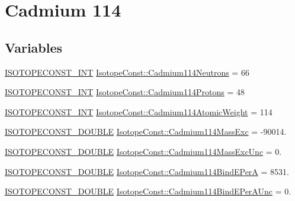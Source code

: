 \hypertarget{group___isotope_const-_cadmium-_cd114}{}\section{Cadmium 114}
\label{group___isotope_const-_cadmium-_cd114}
\subsection*{Variables}
\begin{DoxyCompactItemize}
\item 
\mbox{\hyperlink{group___isotope_const-_macros_ga5f18360b3e99483a35c32d789e62621c}{I\+S\+O\+T\+O\+P\+E\+C\+O\+N\+S\+T\+\_\+\+I\+NT}} \mbox{\hyperlink{group___isotope_const-_cadmium-_cd114_ga06ba1887fdc09963d05c6058df8bcdec}{Isotope\+Const\+::\+Cadmium114\+Neutrons}} = 66
\item 
\mbox{\hyperlink{group___isotope_const-_macros_ga5f18360b3e99483a35c32d789e62621c}{I\+S\+O\+T\+O\+P\+E\+C\+O\+N\+S\+T\+\_\+\+I\+NT}} \mbox{\hyperlink{group___isotope_const-_cadmium-_cd114_ga3fcc86c15d983e409a2fe22e88c5fe9d}{Isotope\+Const\+::\+Cadmium114\+Protons}} = 48
\item 
\mbox{\hyperlink{group___isotope_const-_macros_ga5f18360b3e99483a35c32d789e62621c}{I\+S\+O\+T\+O\+P\+E\+C\+O\+N\+S\+T\+\_\+\+I\+NT}} \mbox{\hyperlink{group___isotope_const-_cadmium-_cd114_ga52f0160d4be26c3f2ab31dce613cdc46}{Isotope\+Const\+::\+Cadmium114\+Atomic\+Weight}} = 114
\item 
\mbox{\hyperlink{group___isotope_const-_macros_ga8f45a7272ce02c0b4c65c44636ed719a}{I\+S\+O\+T\+O\+P\+E\+C\+O\+N\+S\+T\+\_\+\+D\+O\+U\+B\+LE}} \mbox{\hyperlink{group___isotope_const-_cadmium-_cd114_gafe12267f413c876a2553f8ff8598c98d}{Isotope\+Const\+::\+Cadmium114\+Mass\+Exc}} = -\/90014.
\item 
\mbox{\hyperlink{group___isotope_const-_macros_ga8f45a7272ce02c0b4c65c44636ed719a}{I\+S\+O\+T\+O\+P\+E\+C\+O\+N\+S\+T\+\_\+\+D\+O\+U\+B\+LE}} \mbox{\hyperlink{group___isotope_const-_cadmium-_cd114_ga42a5610a0a1fa34440b10f4cb2b39da2}{Isotope\+Const\+::\+Cadmium114\+Mass\+Exc\+Unc}} = 0.
\item 
\mbox{\hyperlink{group___isotope_const-_macros_ga8f45a7272ce02c0b4c65c44636ed719a}{I\+S\+O\+T\+O\+P\+E\+C\+O\+N\+S\+T\+\_\+\+D\+O\+U\+B\+LE}} \mbox{\hyperlink{group___isotope_const-_cadmium-_cd114_ga0bca92afd849cfb5fe0bce8e0cd3ad02}{Isotope\+Const\+::\+Cadmium114\+Bind\+E\+PerA}} = 8531.
\item 
\mbox{\hyperlink{group___isotope_const-_macros_ga8f45a7272ce02c0b4c65c44636ed719a}{I\+S\+O\+T\+O\+P\+E\+C\+O\+N\+S\+T\+\_\+\+D\+O\+U\+B\+LE}} \mbox{\hyperlink{group___isotope_const-_cadmium-_cd114_ga6d4347b7f2bab5924d1880fdbde9ef1b}{Isotope\+Const\+::\+Cadmium114\+Bind\+E\+Per\+A\+Unc}} = 0.

\end{DoxyCompactItemize}
